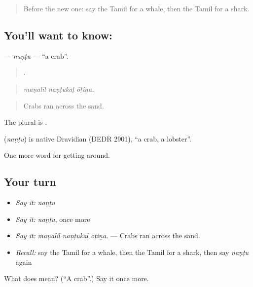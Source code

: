 \begin{quote}
Before the new one: say the Tamil for a whale, then the Tamil for a shark.
\end{quote}

\subsection*{You'll want to know: }
\textbf{} — \emph{naṇṭu} — \textquotedblleft{}a crab\textquotedblright{}.

\begin{quote}
  .
\end{quote}

\begin{quote}
\emph{maṇalil naṇṭukaḷ ōṭiṉa.}
\end{quote}

\begin{quote}
Crabs ran across the sand.
\end{quote}

The plural is .

\begin{cousinweb}
\textbf{} (\emph{naṇṭu}) is native Dravidian (DEDR 2901), \textquotedblleft{}a crab, a lobster\textquotedblright{}.
\end{cousinweb}

\begin{grammarlens}[title={What you've built}]
One more word for getting around.
\end{grammarlens}

\subsection*{Your turn}
\begin{itemize}
\raggedright
  \item \emph{Say it:} \emph{naṇṭu}
  \item \emph{Say it:} \emph{naṇṭu}, once more
  \item \emph{Say it:} \emph{maṇalil naṇṭukaḷ ōṭiṉa.} — Crabs ran across the sand.
  \item \emph{Recall:} say the Tamil for a whale, then the Tamil for a shark, then say \emph{naṇṭu} again
\end{itemize}

\begin{tcolorbox}[breakable,colback=teal!4,colframe=teal!35!black,title={Before you move on}]
What does  mean? (\textquotedblleft{}A crab\textquotedblright{}.) Say it once more.
\end{tcolorbox}
